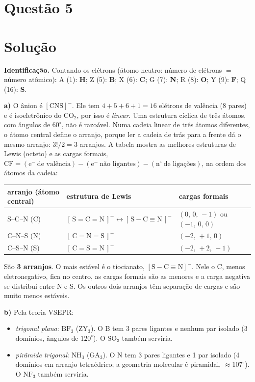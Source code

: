 \documentclass{article}%
\begin{document}
\section*{Questão 5}

\section*{Solução}

\textbf{Identificação.} Contando os elétrons (átomo neutro: número de elétrons $=$ número atômico):
A (1): \textbf{H}; Z (5): \textbf{B}; X (6): \textbf{C}; G (7): \textbf{N};
R (8): \textbf{O}; Y (9): \textbf{F}; Q (16): \textbf{S}.

\medskip
\textbf{a)} O ânion é $[\text{CNS}]^{-}$. Ele tem $4+5+6+1=16$ elétrons de valência
(8 pares) e é isoeletrônico do $\text{CO}_2$, por isso é \emph{linear}. Uma estrutura cíclica de
três átomos, com ângulos de $60^\circ$, não é razoável. Numa cadeia linear de três átomos
diferentes, o átomo central define o arranjo, porque ler a cadeia de trás para a frente dá o
mesmo arranjo: $3!/2=3$ arranjos. A tabela mostra as melhores estruturas de Lewis (octeto) e as cargas formais,
$\text{CF}=(\text{e}^-\ \text{de valência})-(\text{e}^-\ \text{não ligantes})-(\text{n}^\circ\ \text{de ligações})$,
na ordem dos átomos da cadeia:
\begin{center}
\begin{tabular}{lll}
arranjo (átomo central) & estrutura de Lewis & cargas formais \\ \hline
S--C--N (C) & $[\,\text{S}=\text{C}=\text{N}\,]^{-}\leftrightarrow[\,\text{S}-\text{C}\equiv\text{N}\,]^{-}$ & $(0,\,0,\,-1)$ ou $(-1,\,0,\,0)$ \\
C--N--S (N) & $[\,\text{C}=\text{N}=\text{S}\,]^{-}$ & $(-2,\,+1,\,0)$ \\
C--S--N (S) & $[\,\text{C}=\text{S}=\text{N}\,]^{-}$ & $(-2,\,+2,\,-1)$
\end{tabular}
\end{center}
São \textbf{3 arranjos}. O mais estável é o tiocianato, $[\text{S}{-}\text{C}{\equiv}\text{N}]^-$.
Nele o C, menos eletronegativo, fica no centro, as cargas formais são as menores e a carga negativa se distribui
entre N e S. Os outros dois arranjos têm separação de cargas e são muito menos estáveis.

\medskip
\textbf{b)} Pela teoria VSEPR:
\begin{itemize}
\item \emph{trigonal plana}: $\text{BF}_3$ ($\text{ZY}_3$). O B tem 3 pares ligantes e
nenhum par isolado (3 domínios, ângulos de $120^\circ$). O $\text{SO}_3$ também serviria.
\item \emph{pirâmide trigonal}: $\text{NH}_3$ ($\text{GA}_3$). O N tem 3 pares ligantes e
1 par isolado (4 domínios em arranjo tetraédrico; a geometria molecular é piramidal, $\approx 107^\circ$).
O $\text{NF}_3$ também serviria.
\end{itemize}
\end{document}
